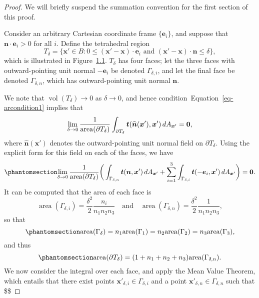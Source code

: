 \documentclass[
  letterpaper,
  DIV=11,
  numbers=noendperiod]{scrreprt}
\theoremstyle{plain}
\theoremstyle{remark}
\begin{document}
\begin{proof}
We will briefly suspend the summation convention for the first section
of this proof.

Consider an arbitrary Cartesian coordinate frame
\(\{{\boldsymbol{e}}_i\}\), and suppose that
\({\boldsymbol{n}}\cdot{\boldsymbol{e}}_i>0\) for all \(i\). Define the
tetrahedral region
\[T_\delta = \big\{{\boldsymbol{x}}'\in B: 0\leq ({\boldsymbol{x}}'-{\boldsymbol{x}})\cdot{\boldsymbol{e}}_i\text{ and }({\boldsymbol{x}}'-{\boldsymbol{x}})\cdot{\boldsymbol{n}}\leq\delta \big\},\]
which is illustrated in Figure~\hyperref[fig:stresstetradhedron]{1.1}.
\(T_\delta\) has four faces; let the three faces with outward-pointing
unit normal \(-{\boldsymbol{e}}_i\) be denoted \(\Gamma_{\delta,i}\),
and let the final face be denoted \(\Gamma_{\delta,n}\), which has
outward-pointing unit normal \({\boldsymbol{n}}\).

We note that \({\operatorname{vol}}(T_\delta)\to0\) as \(\delta\to0\),
and hence condition~Equation~\ref{eq-arcondition1} implies that
\[\lim_{\delta\to0}\frac{1}{{\operatorname{area}}(\partial T_\delta)}\int_{\partial T_\delta} {\boldsymbol{t}}(\widehat{{\boldsymbol{n}}}({\boldsymbol{x}}'),{\boldsymbol{x}}')\,dA_{{\boldsymbol{x}}'} = \bf0,\]
where \(\widehat{{\boldsymbol{n}}}({\boldsymbol{x}}')\) denotes the
outward-pointing unit normal field on \(\partial T_\delta\). Using the
explicit form for this field on each of the faces, we have
\begin{equation}\phantomsection\label{eq-tetlimit}{
    \lim_{\delta\to0}\frac{1}{{\operatorname{area}}(\partial T_\delta)}\bigg(\int_{\Gamma_{\delta,n}} {\boldsymbol{t}}({\boldsymbol{n}},{\boldsymbol{x}}')\,dA_{{\boldsymbol{x}}'}+\sum_{i=1}^3\int_{\Gamma_{\delta,i}} {\boldsymbol{t}}(-{\boldsymbol{e}}_i,{\boldsymbol{x}}')\,dA_{{\boldsymbol{x}}'}\bigg) = \bf0.}\end{equation}
It can be computed that the area of each face is
\[{\operatorname{area}}(\Gamma_{\delta,i}) = \frac{\delta^2}{2}\frac{n_i}{n_1n_2n_3}\quad\text{and}\quad{\operatorname{area}}(\Gamma_{\delta,n}) = \frac{\delta^2}{2}\frac{1}{n_1n_2n_3},\]
so that \begin{equation}\phantomsection\label{eq-tetarearelation1}{
    {\operatorname{area}}(\Gamma_\delta) = n_1 {\operatorname{area}}(\Gamma_1)=n_2{\operatorname{area}}(\Gamma_2) = n_3{\operatorname{area}}(\Gamma_3),
}\end{equation} and thus
\begin{equation}\phantomsection\label{eq-tetarearelation2}{
    {\operatorname{area}}(\partial T_\delta) = (1+n_1+n_2+n_3){\operatorname{area}}(\Gamma_{\delta,n}).}\end{equation}
We now consider the integral over each face, and apply the Mean Value
Theorem, which entails that there exist points
\({\boldsymbol{x}}'_{\delta,i}\in\Gamma_{\delta,i}\) and a point
\({\boldsymbol{x}}'_{\delta,n}\in\Gamma_{\delta,n}\) such that \$\$


\end{proof}
\end{document}
